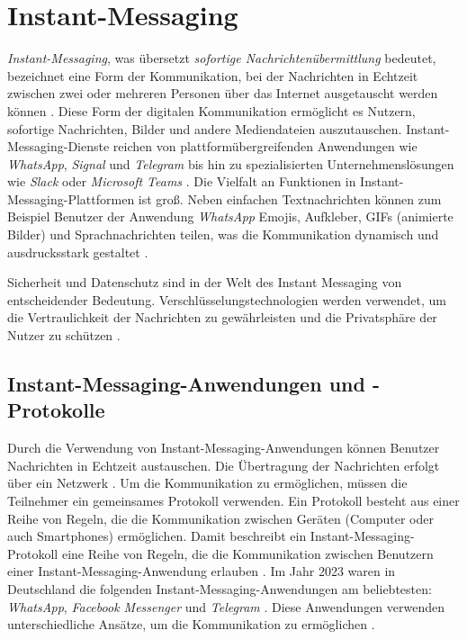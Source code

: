 \section{Instant-Messaging}
\label{sec:instant_messaging_basics}

\textit{Instant-Messaging}, was übersetzt \textit{sofortige Nachrichtenübermittlung} bedeutet, bezeichnet eine Form der Kommunikation, bei der Nachrichten in Echtzeit zwischen zwei oder mehreren Personen über das Internet ausgetauscht werden können \Parencite[S. 69]{nist_mobileDeviceForensics}. Diese Form der digitalen Kommunikation ermöglicht es Nutzern, sofortige Nachrichten, Bilder und andere Mediendateien auszutauschen. Instant-Messaging-Dienste reichen von plattformübergreifenden Anwendungen wie \textit{WhatsApp}, \textit{Signal} und \textit{Telegram} bis hin zu spezialisierten Unternehmenslösungen wie \textit{Slack} oder \textit{Microsoft Teams} \parencite{Plett_IMDefinition}. Die Vielfalt an Funktionen in Instant-Messaging-Plattformen ist groß. Neben einfachen Textnachrichten können zum Beispiel Benutzer der Anwendung \textit{WhatsApp} Emojis, Aufkleber, GIFs (animierte Bilder) und Sprachnachrichten teilen, was die Kommunikation dynamisch und ausdrucksstark gestaltet \Parencite{whatsapp_funktionen}.

Sicherheit und Datenschutz sind in der Welt des Instant Messaging von entscheidender Bedeutung. Verschlüsselungstechnologien werden verwendet, um die Vertraulichkeit der Nachrichten zu gewährleisten und die Privatsphäre der Nutzer zu schützen \parencite[S. 13706]{Wang_IMSecurity}.


\subsection{Instant-Messaging-Anwendungen und -Protokolle}
Durch die Verwendung von Instant-Messaging-Anwendungen können Benutzer Nachrichten in Echtzeit austauschen. Die Übertragung der Nachrichten erfolgt über ein Netzwerk \Parencite[S. 69]{nist_mobileDeviceForensics}. Um die Kommunikation zu ermöglichen, müssen die Teilnehmer ein gemeinsames Protokoll verwenden. Ein Protokoll besteht aus einer Reihe von Regeln, die die Kommunikation zwischen Geräten (Computer oder auch Smartphones) ermöglichen. Damit beschreibt ein Instant-Messaging-Protokoll eine Reihe von Regeln, die die Kommunikation zwischen Benutzern einer Instant-Messaging-Anwendung erlauben \Parencite{Novalnet_Protokoll}. Im Jahr 2023 waren in Deutschland die folgenden Instant-Messaging-Anwendungen am beliebtesten: \textit{WhatsApp}, \textit{Facebook Messenger} und \textit{Telegram} \parencite{Statista_MessengerNutzung}. Diese Anwendungen verwenden unterschiedliche Ansätze, um die Kommunikation zu ermöglichen \parencite[S. 103]{Luntovskyy_ModRechnernetze}. 


